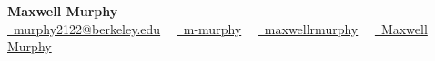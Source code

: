 \centering
    {\Large \textbf{Maxwell Murphy}} \\
    {
        \href{mailto:murphy2122@berkeley.edu}{\faEnvelope \, murphy2122@berkeley.edu} \, \textbullet \, 
        \href{https://www.github.com/m-murphy}{\faGithub \, m-murphy} \, \textbullet \,
        \href{https://www.linkedin.com/in/maxwellrmurphy/}{\faLinkedin \, maxwellrmurphy} \, \textbullet \,
        \href{https://scholar.google.com/citations?user=Y1cHI8IAAAAJ}{\aiGoogleScholar \, Maxwell Murphy}
    }

\justifying